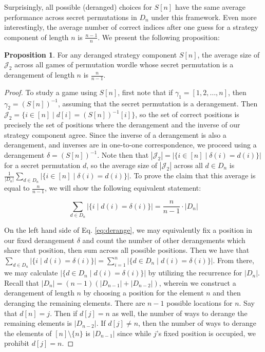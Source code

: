 \documentclass[article]{amsart}
\theoremstyle{definition}
\newtheorem{proposition}[theorem]{Proposition}
\theoremstyle{definition}
\theoremstyle{remark}
\begin{document}
Surprisingly, all possible (deranged) choices for $S[n]$ have the same average performance across secret permutations in $D_n$ under this framework. Even more interestingly, the average number of correct indices after one guess for a strategy component of length $n$ is $\frac{n-1}{n}$. We present the following proposition:

\begin{proposition} \label{prop:derange}
    For any deranged strategy component $S[n]$, the average size of $\mathcal{J}_2$ across all games of permutation wordle whose secret permutation is a derangement of length $n$ is $\frac{n}{n-1}$.
\end{proposition}

\begin{proof}
To study a game using $S[n]$, first note that if $\gamma_1 = [1,2,\dots,n]$, then $\gamma_2 = (S[n])^{-1}$, assuming that the secret permutation is a derangement. Then $\mathcal{J}_2 = \{i \in [n] \mid d[i] = (S[n])^{-1}[i] \} $, so the set of correct positions is precisely the set of positions where the derangement and the inverse of our strategy component agree. Since the inverse of a derangement is also a derangement, and inverses are in one-to-one correspondence, we proceed using a derangement $\delta = (S[n])^{-1}$. Note then that $|\mathcal{J}_2| = \left| \{ i \in [n] \mid \delta(i) = d(i) \} \right|$ for a secret permutation $d$, so the average size of $|\mathcal{J}_2|$ across all $d \in D_n$ is $\frac{1}{|D_n|} \sum_{d \in D_n} \left| \{ i \in [n] \mid \delta(i) = d(i) \} \right|$. To prove the claim that this average is equal to $\frac{n}{n-1}$, we will show the following equivalent statement:

\begin{equation} \label{eq:derange}
    \sum_{d \in D_n} \left| \{ i \mid d(i) = \delta (i) \} \right| = \frac{n}{n-1} \cdot | D_n|
\end{equation}

\vspace{0.25cm}

On the left hand side of Eq. \ref{eq:derange}, we may equivalently fix a position in our fixed derangement $\delta$ and count the number of other derangements which share that position, then sum across all possible positions. Then we have that 
$ \sum_{d \in D_n} \left| \{ i \mid d(i) = \delta(i) \} \right| 
= \sum_{i=1}^n \left| \{ d \in D_n \mid d(i) = \delta(i) \} \right| $. From there, we may calculate $| \{ d \in D_n \mid d(i) = \delta(i) \} |$ by utilizing the recurrence for $|D_n|$. Recall that $|D_n| = (n-1)(|D_{n-1}| + |D_{n-2}|)$, wherein we construct a derangement of length $n$ by choosing a position for the element $n$ and then deranging the remaining elements. There are $n-1$ possible locations for $n$. Say that $d[n] = j$. Then if $d[j] = n$ as well, the number of ways to derange the remaining elements is $|D_{n-2}|$. If $d[j] \neq n$, then the number of ways to derange the elements of $[n] \setminus \{n\}$ is $|D_{n-1}|$ since while $j$'s fixed position is occupied, we prohibit $d[j] = n$.


\end{proof}
\end{document}
